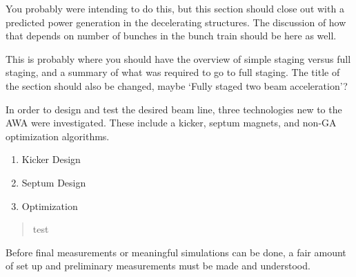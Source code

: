 \documentclass{iitthesis}
\newcommand{\lsnote}[1]{\textsf{{\color{violet}{ LS note:}   #1 }}}
\begin{document}
\lsnote{You probably were intending to do this, but this section should close out with a predicted power generation 
in the decelerating structures.  The discussion of how that depends on number of bunches in the bunch train should be here as well.}



 \label{sec:requirements}

\lsnote{This is probably where you should have the overview of simple staging versus full staging, and a summary of what was required to go to full staging.  The title of the section should also be changed, maybe `Fully staged two beam acceleration'?}

In order to design and test the desired beam line, three technologies 
new to the AWA were investigated. These include a kicker, septum magnets, 
and non-GA optimization algorithms.

\begin{enumerate}
	\item Kicker Design
	\item Septum Design
	\item Optimization 
\end{enumerate}

\begin{quotation}
	test
\end{quotation}

\clearpage


Before final measurements or meaningful simulations can be done, 
a fair amount of set up and preliminary measurements 
must be made and understood. 

 \label{sec:uvoptics}
\end{document}
